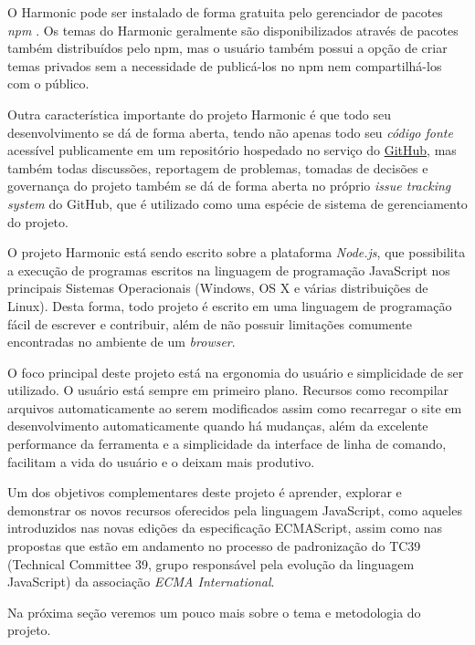 \documentclass[ppginf, pep]{esinucpel}
\begin{document}
O Harmonic pode ser instalado de forma gratuita pelo gerenciador de pacotes \emph{npm} \cite{npm}. Os temas do Harmonic geralmente são disponibilizados através de pacotes também distribuídos pelo npm, mas o usuário também possui a opção de criar temas privados sem a necessidade de publicá-los no npm nem compartilhá-los com o público.

Outra característica importante do projeto Harmonic é que todo seu desenvolvimento se dá de forma aberta, tendo não apenas todo seu \emph{código fonte} acessível publicamente em um repositório hospedado no serviço do \href{https://github.com/}{GitHub}, mas também todas discussões, reportagem de problemas, tomadas de decisões e governança do projeto também se dá de forma aberta no próprio \textit{issue tracking system} do GitHub, que é utilizado como uma espécie de sistema de gerenciamento do projeto.

O projeto Harmonic está sendo escrito sobre a plataforma \emph{Node.js}, que possibilita a execução de programas escritos na linguagem de programação JavaScript nos principais Sistemas Operacionais (Windows, OS X e várias distribuições de Linux). Desta forma, todo projeto é escrito em uma linguagem de programação fácil de escrever e contribuir, além de não possuir limitações comumente encontradas no ambiente de um \textit{browser}.

O foco principal deste projeto está na ergonomia do usuário e simplicidade de ser utilizado. O usuário está sempre em primeiro plano. Recursos como recompilar arquivos automaticamente ao serem modificados assim como recarregar o site em desenvolvimento automaticamente quando há mudanças, além da excelente performance da ferramenta e a simplicidade da interface de linha de comando, facilitam a vida do usuário e o deixam mais produtivo.

Um dos objetivos complementares deste projeto é aprender, explorar e demonstrar os novos recursos oferecidos pela linguagem JavaScript, como aqueles introduzidos nas novas edições da especificação ECMAScript, assim como nas propostas que estão em andamento no processo de padronização do TC39 (Technical Committee 39, grupo responsável pela evolução da linguagem JavaScript) da associação \textit{ECMA International}. %

Na próxima seção veremos um pouco mais sobre o tema e metodologia do projeto. %

\end{document}
